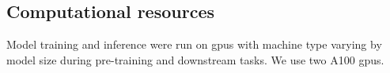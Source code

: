 \documentclass[pdflatex, sn-mathphys-num, lineno]{sn-jnl}%
\theoremstyle{thmstyleone}%
\theoremstyle{thmstyletwo}%
\theoremstyle{thmstylethree}%
\begin{document}
\begin{appendices}
	\section{Computational resources}

	Model training and inference were run on \glspl{gpu} with machine type varying by model size during pre-training and downstream tasks.
	We use two  A100 \glspl{gpu}.
\end{appendices}


\end{document}
